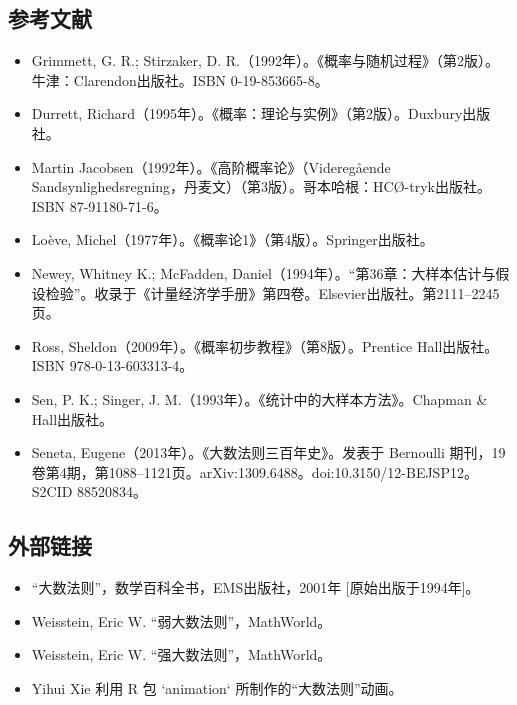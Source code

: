 \subsection{参考文献}
\begin{itemize}
\item Grimmett, G. R.; Stirzaker, D. R.（1992年）。《概率与随机过程》（第2版）。牛津：Clarendon出版社。ISBN 0-19-853665-8。
\item Durrett, Richard（1995年）。《概率：理论与实例》（第2版）。Duxbury出版社。
\item Martin Jacobsen（1992年）。《高阶概率论》（Videregående Sandsynlighedsregning，丹麦文）（第3版）。哥本哈根：HCØ-tryk出版社。ISBN 87-91180-71-6。
\item Loève, Michel（1977年）。《概率论1》（第4版）。Springer出版社。
\item Newey, Whitney K.; McFadden, Daniel（1994年）。“第36章：大样本估计与假设检验”。收录于《计量经济学手册》第四卷。Elsevier出版社。第2111–2245页。
\item Ross, Sheldon（2009年）。《概率初步教程》（第8版）。Prentice Hall出版社。ISBN 978-0-13-603313-4。
\item Sen, P. K.; Singer, J. M.（1993年）。《统计中的大样本方法》。Chapman & Hall出版社。
\item Seneta, Eugene（2013年）。《大数法则三百年史》。发表于 Bernoulli 期刊，19卷第4期，第1088–1121页。arXiv:1309.6488。doi:10.3150/12-BEJSP12。S2CID 88520834。
\end{itemize}
\subsection{外部链接}
\begin{itemize}
\item “大数法则”，数学百科全书，EMS出版社，2001年 [原始出版于1994年]。
\item Weisstein, Eric W. “弱大数法则”，MathWorld。
\item Weisstein, Eric W. “强大数法则”，MathWorld。
\item Yihui Xie 利用 R 包 `animation` 所制作的“大数法则”动画。
\end{itemize}
